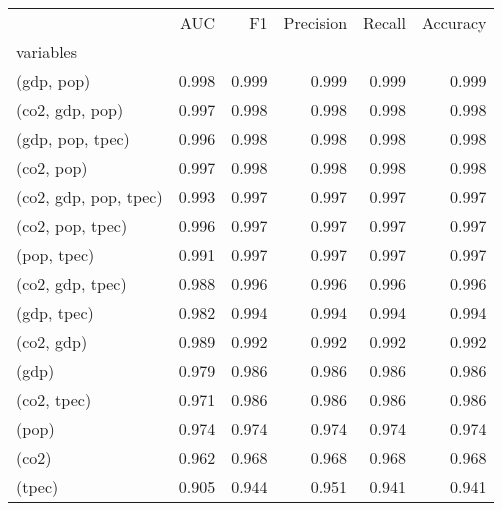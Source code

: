 \begin{tabular}{lrrrrr}
\toprule
 & AUC & F1 & Precision & Recall & Accuracy \\
variables &  &  &  &  &  \\
\midrule
(gdp, pop) & 0.998 & 0.999 & 0.999 & 0.999 & 0.999 \\
(co2, gdp, pop) & 0.997 & 0.998 & 0.998 & 0.998 & 0.998 \\
(gdp, pop, tpec) & 0.996 & 0.998 & 0.998 & 0.998 & 0.998 \\
(co2, pop) & 0.997 & 0.998 & 0.998 & 0.998 & 0.998 \\
(co2, gdp, pop, tpec) & 0.993 & 0.997 & 0.997 & 0.997 & 0.997 \\
(co2, pop, tpec) & 0.996 & 0.997 & 0.997 & 0.997 & 0.997 \\
(pop, tpec) & 0.991 & 0.997 & 0.997 & 0.997 & 0.997 \\
(co2, gdp, tpec) & 0.988 & 0.996 & 0.996 & 0.996 & 0.996 \\
(gdp, tpec) & 0.982 & 0.994 & 0.994 & 0.994 & 0.994 \\
(co2, gdp) & 0.989 & 0.992 & 0.992 & 0.992 & 0.992 \\
(gdp) & 0.979 & 0.986 & 0.986 & 0.986 & 0.986 \\
(co2, tpec) & 0.971 & 0.986 & 0.986 & 0.986 & 0.986 \\
(pop) & 0.974 & 0.974 & 0.974 & 0.974 & 0.974 \\
(co2) & 0.962 & 0.968 & 0.968 & 0.968 & 0.968 \\
(tpec) & 0.905 & 0.944 & 0.951 & 0.941 & 0.941 \\
\bottomrule
\end{tabular}
